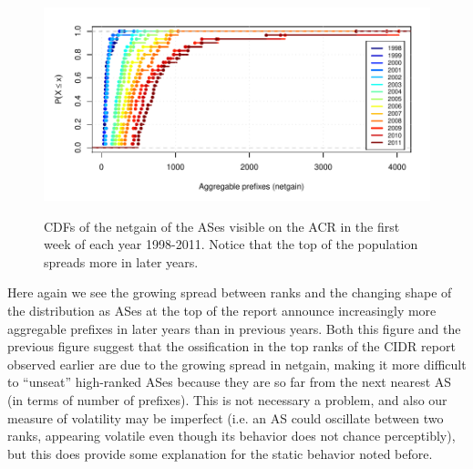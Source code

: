 \begin{figure}[h!]
\begin{centering}
\begin{singlespace}
    \includegraphics[width=6in]{figures/netgain_cdf_acr.pdf}
    \vspace{-2em}\\
    \caption[CDFs of the netgain of the ASes visible on the ACR in the first
    week of each year 1998-2011]{CDFs of the netgain of the ASes visible on the
    ACR in the first week of each year 1998-2011. Notice that the top of the
    population spreads more in later years.}
    \label{fig:netgain_cdf_acr}
\end{singlespace}
\end{centering}
\end{figure}

Here again we see the growing spread between ranks and the changing shape of
the distribution as ASes at the top of the report announce increasingly more
aggregable prefixes in later years than in previous years. Both this figure and
the previous figure suggest that the ossification in the top ranks of the CIDR
report observed earlier are due to the growing spread in netgain, making it
more difficult to ``unseat'' high-ranked ASes because they are so far from the
next nearest AS (in terms of number of prefixes). This is not necessary a
problem, and also our measure of volatility may be imperfect (i.e. an AS could
oscillate between two ranks, appearing volatile even though its behavior does
not chance perceptibly), but this does provide some explanation for the static
behavior noted before.

%

